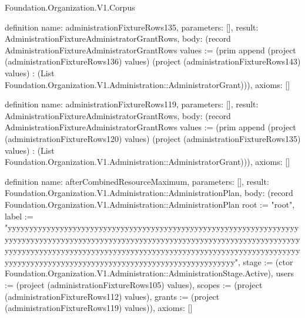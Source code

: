 \begin{lexlean}{Foundation.Organization.V1.Corpus}
\begin{semanticmodule}
definition{
  name: administrationFixtureRows135,
  parameters: [],
  result: AdministrationFixtureAdministratorGrantRows,
  body: (record AdministrationFixtureAdministratorGrantRows {values := (prim append (project (administrationFixtureRows136) values) (project (administrationFixtureRows143) values) : (List Foundation.Organization.V1.Administration::AdministratorGrant))}),
  axioms: []
}

definition{
  name: administrationFixtureRows119,
  parameters: [],
  result: AdministrationFixtureAdministratorGrantRows,
  body: (record AdministrationFixtureAdministratorGrantRows {values := (prim append (project (administrationFixtureRows120) values) (project (administrationFixtureRows135) values) : (List Foundation.Organization.V1.Administration::AdministratorGrant))}),
  axioms: []
}

definition{
  name: afterCombinedResourceMaximum,
  parameters: [],
  result: Foundation.Organization.V1.Administration::AdministrationPlan,
  body: (record Foundation.Organization.V1.Administration::AdministrationPlan {root := "root", label := "yyyyyyyyyyyyyyyyyyyyyyyyyyyyyyyyyyyyyyyyyyyyyyyyyyyyyyyyyyyyyyyyyyyyyyyyyyyyyyyyyyyyyyyyyyyyyyyyyyyyyyyyyyyyyyyyyyyyyyyyyyyyyyyyyyyyyyyyyyyyyyyyyyyyyyyyyyyyyyyyyyyyyyyyyyyyyyyyyyyyyyyyyyyyyyyyyyyyyyyyyyyyyyyyyyyyyyyyyyyyyyyyyyyyyyyyyyyyyyyyyyyyyyyyyyyyyyyy", stage := (ctor Foundation.Organization.V1.Administration::AdministrationStage.Active), users := (project (administrationFixtureRows105) values), scopes := (project (administrationFixtureRows112) values), grants := (project (administrationFixtureRows119) values)}),
  axioms: []
}


\end{semanticmodule}
\end{lexlean}
